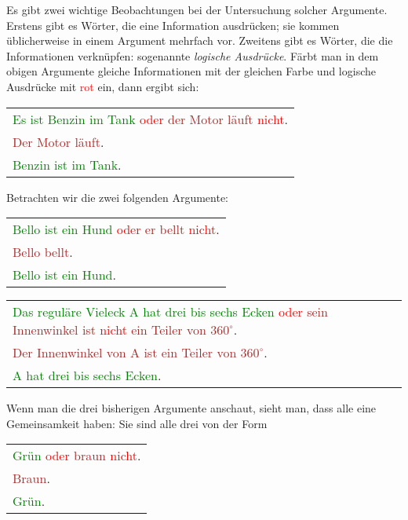 \documentclass{zusammenfassung}
\begin{document}
Es gibt zwei wichtige Beobachtungen bei der Untersuchung solcher Argumente. Erstens gibt es Wörter, die eine Information
ausdrücken; sie kommen üblicherweise in einem Argument mehrfach vor. Zweitens gibt es Wörter, die die Informationen verknüpfen:
sogenannte \emph{logische Ausdrücke}. Färbt man in dem obigen Argumente gleiche Informationen mit der gleichen Farbe und logische
Ausdrücke mit \textcolor{red}{rot} ein, dann ergibt sich:

\begin{tabular}{l}
  \textcolor{green}{Es ist Benzin im Tank} \textcolor{red}{oder} \textcolor{brown}{der Motor läuft} \textcolor{red}{nicht}.\\
  \textcolor{brown}{Der Motor läuft}.\\
  \arrayrulecolor{red}\hline
  \textcolor{green}{Benzin ist im Tank}.
\end{tabular}

Betrachten wir die zwei folgenden Argumente:

\begin{tabular}{l}
  \textcolor{green}{Bello ist ein Hund} \textcolor{red}{oder} \textcolor{brown}{er bellt} \textcolor{red}{nicht}.\\
  \textcolor{brown}{Bello bellt}.\\
  \arrayrulecolor{red}\hline
  \textcolor{green}{Bello ist ein Hund}.
\end{tabular}

\begin{tabular}{l}
  \textcolor{green}{Das reguläre Vieleck A hat drei bis sechs Ecken} \textcolor{red}{oder} 
  \textcolor{brown}{sein Innenwinkel ist \textcolor{red}{nicht} ein Teiler von $360^\circ$}.\\
  \textcolor{brown}{Der Innenwinkel von A ist ein Teiler von $360^\circ$}.\\
  \arrayrulecolor{red}\hline
  \textcolor{green}{A hat drei bis sechs Ecken}.
\end{tabular}

Wenn man die drei bisherigen Argumente anschaut, sieht man, dass alle eine Gemeinsamkeit haben: Sie sind alle drei von der Form

\begin{tabular}{l}
  \textcolor{green}{Grün} \textcolor{red}{oder} \textcolor{brown}{braun} \textcolor{red}{nicht}.\\
  \textcolor{brown}{Braun}.\\
  \arrayrulecolor{red}\hline
  \textcolor{green}{Grün}.
\end{tabular}
\end{document}
